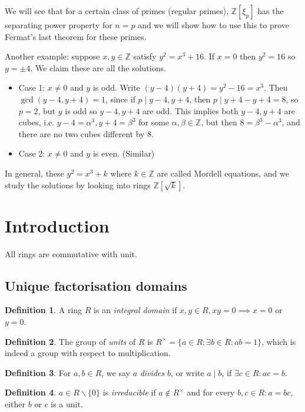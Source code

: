 \documentclass{article}
\newcommand{\Z}{\mathbb{Z}}
\theoremstyle{definition}
\newtheorem{defn}{Definition}[subsection]
\begin{document}
We will see that for a certain class of primes (regular primes), $\Z[\xi_p]$ has the separating power property for $n=p$ and we will show how to use this to prove Fermat's last theorem for these primes.

Another example: suppose $x,y\in\Z$ satisfy $y^2=x^3+16$. If $x=0$ then $y^2=16$ so $y=\pm 4$. We claim these are all the solutions.

\begin{itemize}
\item Case 1: $x\neq 0$ and $y$ is odd. Write $(y-4)(y+4)=y^2-16=x^3$. Then $\gcd(y-4,y+4)=1$, since if $p\mid y-4,y+4$, then $p\mid y+4-y+4=8$, so $p=2$, but $y$ is odd so $y-4,y+4$ are odd. This implies both $y-4,y+4$ are cubes, i.e. $y-4=\alpha^3,y+4=\beta^3$ for some $\alpha,\beta\in\Z$, but then $8=\beta^3-\alpha^3$, and there are no two cubes different by 8.
\item Case 2: $x\neq 0$ and $y$ is even. (Similar)
\end{itemize}

In general, these $y^2=x^3+k$ where $k\in\Z$ are called Mordell equations, and we study the solutions by looking into rings $\Z\left[\sqrt k\right]$.

\section{Introduction}
All rings are commutative with unit.
\subsection{Unique factorisation domains}
\begin{defn}
A ring $R$ is an \textit{integral domain} if $x,y\in R,xy=0\implies x=0$ or $y=0$.
\end{defn}

\begin{defn}
The group of \textit{units} of $R$ is $R^\times=\{a\in R:\exists b\in R:ab=1\}$, which is indeed a group with respect to multiplication.
\end{defn}

\begin{defn}
For $a,b\in R$, we say $a$ \textit{divides} $b$, or write $a\mid b$, if $\exists c\in R:ac=b$.
\end{defn}

\begin{defn}
$a\in R\backslash\{0\}$ is \textit{irreducible} if $a\notin R^\times$ and for every $b,c\in R:a=bc$, either $b$ or $c$ is a unit.
\end{defn}
\end{document}
